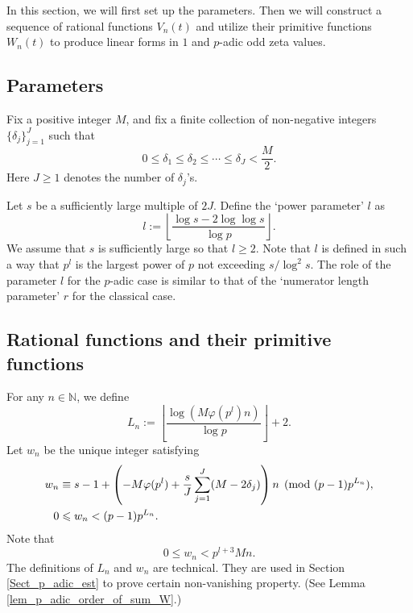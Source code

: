 \documentclass[12pt]{article}
\numberwithin{equation}{section}
\begin{document}
In this section, we will first set up the parameters. Then we will construct a sequence of rational functions $V_n(t)$ and utilize their primitive functions $W_n(t)$ to produce linear forms in $1$ and $p$-adic odd zeta values. 

\subsection{Parameters}

Fix a positive integer $M$, and fix a finite collection of non-negative integers $\{\delta_j\}_{j=1}^{J}$ such that
\begin{equation}\label{condition_on_deltas_p}
	0 \leqslant \delta_1 \leqslant \delta_2 \leqslant \cdots \leqslant \delta_J < \frac{M}{2}.
\end{equation}
Here $J \geqslant 1$ denotes the number of $\delta_j$'s. 

Let $s$ be a sufficiently large multiple of $2J$. Define the `power parameter' $l$ as
\begin{equation}\label{defi_l}
	l := \left\lfloor  \frac{\log s - 2\log\log s}{\log p} \right\rfloor.
\end{equation}
We assume that $s$ is sufficiently large so that $l \geqslant 2$. Note that $l$ is defined in such a way that $p^{l}$ is the largest power of $p$ not exceeding $s/\log^2 s$. The role of the parameter $l$ for the $p$-adic case is similar to that of the `numerator length parameter' $r$ for the classical case.

\subsection{Rational functions and their primitive functions}

For any $n \in \mathbb{N}$, we define
\begin{equation}\label{defi_L_n}
L_n :=  \left\lfloor  \frac{\log(M\varphi(p^l)n)}{\log p}  \right\rfloor + 2.
\end{equation}  
Let $w_n$ be the unique integer satisfying 
\begin{align}
	w_n &\equiv s-1 + \left( -M\varphi(p^l)+ \frac{s}{J}\sum_{j=1}^{J}(M-2\delta_j) \right)n \pmod{(p-1)p^{L_n}}, \label{w_n_prop_cong} \\
	0 &\leqslant w_n < (p-1)p^{L_n}. \notag
\end{align}
Note that 
\begin{equation}\label{w_n_est}
	0 \leqslant w_n  < p^{l+3}Mn.
\end{equation}
The definitions of $L_n$ and $w_n$ are technical. They are used in Section \ref{Sect_p_adic_est} to prove certain non-vanishing property. (See Lemma \ref{lem_p_adic_order_of_sum_W}.)
\end{document}
